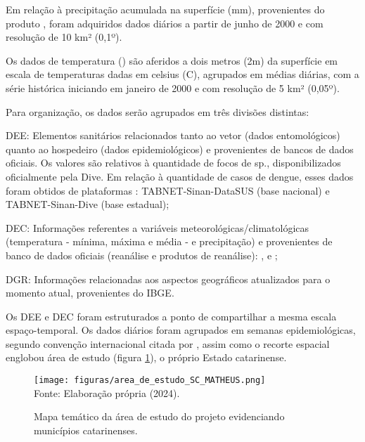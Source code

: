 \indent Em relação à precipitação acumulada na superfície (mm), provenientes do produto , foram adquiridos dados diários a partir de junho de 2000 e com resolução de 10 km² (0,1º).

\indent Os dados de temperatura () são aferidos a dois metros (2m) da superfície em escala de temperaturas dadas em celsius (C), agrupados em médias diárias, com a série histórica iniciando em janeiro de 2000 e com resolução de 5 km² (0,05º).

Para organização, os dados serão agrupados em três divisões distintas: 

\begin{alineas}

    \item \acrfull{DEE}: Elementos sanitários relacionados tanto ao vetor (dados entomológicos) quanto ao hospedeiro (dados epidemiológicos) e provenientes de bancos de dados oficiais. Os valores são relativos à quantidade de focos de  sp., disponibilizados oficialmente pela \acrshort{Dive}. Em relação à quantidade de casos de dengue, esses dados foram obtidos de plataformas : TABNET-\acrshort{Sinan}-\acrshort{DataSUS} (base nacional) e TABNET-\acrshort{Sinan}-\acrshort{Dive} (base estadual);
    
    \item \acrfull{DEC}: Informações referentes a variáveis meteorológicas/climatológicas (temperatura - mínima, máxima e média - e precipitação) e provenientes de banco de dados oficiais (reanálise e produtos de reanálise):  ,  e ;

    \item \acrfull{DGR}: Informações relacionadas aos aspectos geográficos atualizados para o momento atual, provenientes do \acrshort{IBGE}. 
    
\end{alineas}

\indent Os \acrshort{DEE} e \acrshort{DEC} foram estruturados a ponto de compartilhar a mesma escala espaço-temporal. Os dados diários foram agrupados em semanas epidemiológicas, segundo convenção internacional citada por , assim como o recorte espacial englobou área de estudo (figura \ref{fig:area_de_estudo}), o próprio Estado catarinense.

\begin{figure}[htbp]
    \centering
    \caption{Mapa temático da área de estudo do projeto evidenciando municípios catarinenses.}
    \texttt{[image: figuras/area\_de\_estudo\_SC\_MATHEUS.png]}
    \label{fig:area_de_estudo}
    \\
    \vspace{-0.05cm}\hspace{-7.5cm}\small{Fonte: Elaboração própria (2024).} 
\end{figure}

